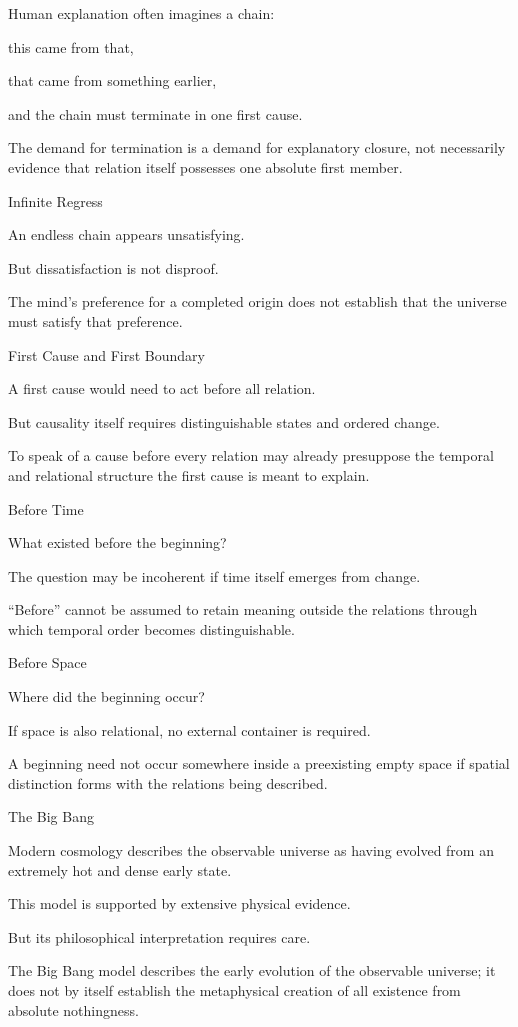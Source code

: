 Human explanation often imagines a chain:

this came from that,

that came from something earlier,

and the chain must terminate in one first cause.

The demand for termination is a demand for explanatory closure, not necessarily evidence that relation itself possesses one absolute first member.

Infinite Regress

An endless chain appears unsatisfying.

But dissatisfaction is not disproof.

The mind’s preference for a completed origin does not establish that the universe must satisfy that preference.

First Cause and First Boundary

A first cause would need to act before all relation.

But causality itself requires distinguishable states and ordered change.

To speak of a cause before every relation may already presuppose the temporal and relational structure the first cause is meant to explain.

Before Time

What existed before the beginning?

The question may be incoherent if time itself emerges from change.

“Before” cannot be assumed to retain meaning outside the relations through which temporal order becomes distinguishable.

Before Space

Where did the beginning occur?

If space is also relational, no external container is required.

A beginning need not occur somewhere inside a preexisting empty space if spatial distinction forms with the relations being described.

The Big Bang

Modern cosmology describes the observable universe as having evolved from an extremely hot and dense early state.

This model is supported by extensive physical evidence.

But its philosophical interpretation requires care.

The Big Bang model describes the early evolution of the observable universe; it does not by itself establish the metaphysical creation of all existence from absolute nothingness.

